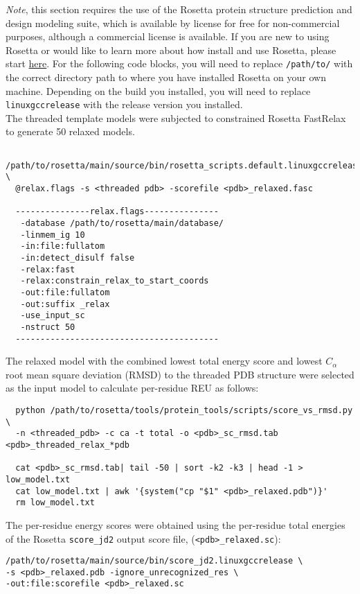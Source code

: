 \documentclass[10pt]{article}
\begin{document}
\textit{Note}, this section requires the use of the Rosetta protein structure prediction and design modeling suite, which is available by license for free for non-commercial purposes, although a commercial license is available. If you are new to using Rosetta or would like to learn more about how install and use Rosetta, please start \href{https://www.rosettacommons.org/docs/latest/getting_started/Getting-Started}{here}. For the following code blocks, you will need to replace \texttt{/path/to/} with the correct directory path to where you have installed Rosetta on your own machine. Depending on the build you installed, you will need to replace \texttt{linuxgccrelease} with the release version you installed.\\
The threaded template models were subjected to constrained Rosetta FastRelax to generate 50 relaxed models.
\begin{lstlisting}
  /path/to/rosetta/main/source/bin/rosetta_scripts.default.linuxgccrelease \
  @relax.flags -s <threaded pdb> -scorefile <pdb>_relaxed.fasc
  
  ---------------relax.flags---------------
   -database /path/to/rosetta/main/database/
   -linmem_ig 10
   -in:file:fullatom
   -in:detect_disulf false
   -relax:fast
   -relax:constrain_relax_to_start_coords
   -out:file:fullatom
   -out:suffix _relax
   -use_input_sc
   -nstruct 50
  -----------------------------------------
\end{lstlisting}

The relaxed model with the combined lowest total energy score and lowest $C_{\alpha}$ root mean square deviation (RMSD) to the threaded PDB structure were selected as the input model to calculate per-residue REU as follows:
\begin{lstlisting}
  python /path/to/rosetta/tools/protein_tools/scripts/score_vs_rmsd.py  \
  -n <threaded_pdb> -c ca -t total -o <pdb>_sc_rmsd.tab <pdb>_threaded_relax_*pdb
  
  cat <pdb>_sc_rmsd.tab| tail -50 | sort -k2 -k3 | head -1 > low_model.txt
  cat low_model.txt | awk '{system("cp "$1" <pdb>_relaxed.pdb")}'
  rm low_model.txt
\end{lstlisting}

The per-residue energy scores were obtained using the per-residue total energies of the Rosetta \texttt{score\_jd2} output score file, (\texttt{<pdb>\_relaxed.sc}): 
\begin{lstlisting}
/path/to/rosetta/main/source/bin/score_jd2.linuxgccrelease \
-s <pdb>_relaxed.pdb -ignore_unrecognized_res \
-out:file:scorefile <pdb>_relaxed.sc
\end{lstlisting}
\end{document}
